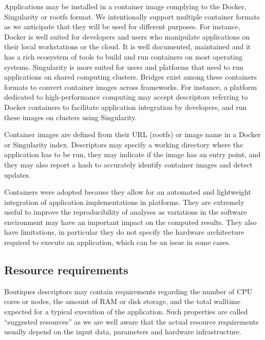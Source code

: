 \documentclass[a4paper,num-refs]{oup-contemporary}
\newcommand{\boutiques}{Boutiques\xspace}
\begin{document}
Applications may be installed in a container image complying to the
Docker, Singularity or rootfs format. We intentionally support
multiple container formats as we anticipate that they will be used for
different purposes. For instance, Docker is well suited for developers
and users who manipulate applications on their local workstations or
the cloud. It is well documented, maintained and it has a rich
ecosystem of tools to build and run containers on most operating
systems. Singularity is more suited for users and platforms that need
to run applications on shared computing clusters. Bridges exist among
these containers formats to convert container images across
frameworks. For instance, a platform dedicated to high-performance computing may accept
descriptors referring to Docker containers to facilitate application
integration by developers, and run these images on clusters using
Singularity.

Container images are defined from their URL (rootfs) or image name in
a Docker or Singularity index. Descriptors may specify a working
directory where the application has to be run, they may indicate if
the image has an entry point, and they may also report a hash to
accurately identify container images and detect updates.

Containers were adopted because they allow for an automated and
lightweight integration of application implementations in
platforms. They are extremely useful to improve the reproducibility of
analyses as variations in the software environment may have an
important impact on the computed results. They also have limitations,
in particular they do not specify the hardware architecture required
to execute an application, which can be an issue in some cases.


\subsection{Resource requirements}

\boutiques descriptors may contain requirements regarding the number
of CPU cores or nodes, the amount of RAM or disk storage, and the
total walltime expected for a typical execution of the
application. Such properties are called ``suggested resources'' as we
are well aware that the actual resource requirements usually depend on
the input data, parameters and hardware infrastructure.
\end{document}
